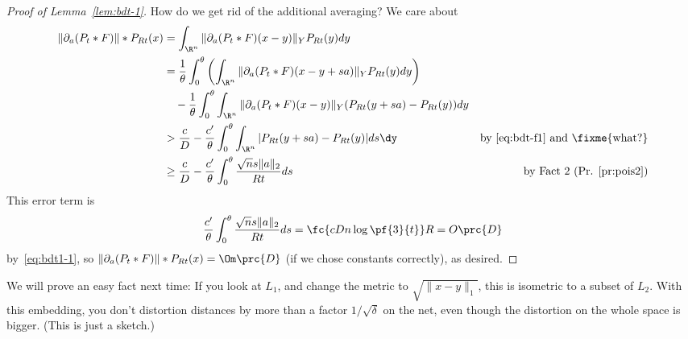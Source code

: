\begin{proof}[Proof of Lemma~\ref{lem:bdt-1}]
How do we get rid of the additional averaging? We care about 
\begin{align*}
\|\partial_a(P_t * F)\| * P_{Rt}(x) 
&= \int_{\R^n} \|\partial_a(P_t *F)(x - y)\|_Y P_{Rt}(y) dy\\
&=
\frac{1}{\theta} \int_0^{\theta} \left(\int_{\R^n} \|\partial_a(P_t *F)(x - y + sa)\|_Y P_{Rt}(y) dy \right)\\
&\quad  - \frac{1}{\theta} \int_0^{\theta} \int_{\R^n} \|\partial_a(P_t *F)(x - y)\|_Y (P_{Rt}(y + sa) - P_{Rt}(y)) dy \\
&> \frac{c}{D} - \frac{c'}{\theta} \int_0^{\theta} \int_{\R^n} | P_{Rt}(y + sa) - P_{Rt}(y)| ds \dy&\text{by \eqref{eq:bdt-f1} and \fixme{what?}}\\
&\geq \frac{c}{D} - \frac{c'}{\theta} \int_0^{\theta} \frac{\sqrt{n}s\|a\|_2}{Rt} ds&\text{by Fact 2 (Pr. \ref{pr:pois2})}
\end{align*}
This error term is
$$
\frac{c'}{\theta} \int_0^{\theta} \frac{\sqrt{n}s\|a\|_2}{Rt} ds
 = \fc{cDn\log \pf{3}{t}}R = O\prc{D}$$
by~\eqref{eq:bdt1-1}, so $\|\partial_a(P_t * F)\| * P_{Rt}(x)=\Om\prc{D}$  (if we chose constants correctly), as desired. 
\end{proof}


We will prove an easy fact next time: If you look at $L_1$, and change the metric to $\sqrt{\|x - y\|_1}$, this is isometric to a subset of $L_2$. %
With this embedding, you don't distortion distances by more than a factor $1/\sqrt{\delta}$ on the net, even though the distortion on the whole space is bigger. (This is just a sketch.)

